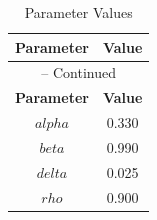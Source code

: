 \begin{center}
\begin{longtable}{cc}
\caption{Parameter Values}\\%
\toprule%
\multicolumn{1}{c}{\textbf{Parameter}} &
\multicolumn{1}{c}{\textbf{Value}}  \\%
\midrule%
\endfirsthead
\multicolumn{2}{c}{{\tablename} \thetable{} -- Continued}\\%
\midrule%
\multicolumn{1}{c}{\textbf{Parameter}} &
\multicolumn{1}{c}{\textbf{Value}} \\%
\midrule%
\endhead
$alpha$ 	 & 	 0.330 \\
$beta$ 	 & 	 0.990 \\
$delta$ 	 & 	 0.025 \\
$rho$ 	 & 	 0.900 \\
\bottomrule%
\end{longtable}
\end{center}

